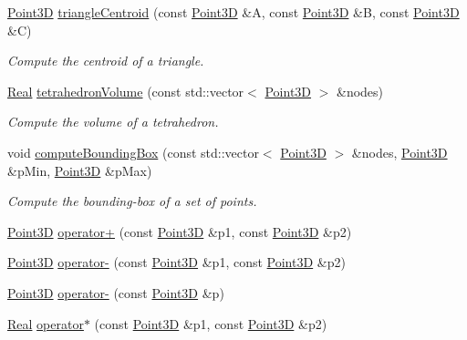 \begin{DoxyCompactItemize}
\hyperlink{classFVCode3D_1_1Point3D}{Point3D} \hyperlink{namespaceFVCode3D_a5b8d6a9c921fcd809d263ef9c484b1ad}{triangle\+Centroid} (const \hyperlink{classFVCode3D_1_1Point3D}{Point3D} \&A, const \hyperlink{classFVCode3D_1_1Point3D}{Point3D} \&B, const \hyperlink{classFVCode3D_1_1Point3D}{Point3D} \&C)
\begin{DoxyCompactList}\small\item\em Compute the centroid of a triangle. \end{DoxyCompactList}\item 
\hyperlink{namespaceFVCode3D_a40c1f5588a248569d80aa5f867080e83}{Real} \hyperlink{namespaceFVCode3D_a8a6b07162e2801b628c3bd4057b9f221}{tetrahedron\+Volume} (const std\+::vector$<$ \hyperlink{classFVCode3D_1_1Point3D}{Point3D} $>$ \&nodes)
\begin{DoxyCompactList}\small\item\em Compute the volume of a tetrahedron. \end{DoxyCompactList}\item 
void \hyperlink{namespaceFVCode3D_ae827f8be7749dd9703b52a52d90c9f9b}{compute\+Bounding\+Box} (const std\+::vector$<$ \hyperlink{classFVCode3D_1_1Point3D}{Point3D} $>$ \&nodes, \hyperlink{classFVCode3D_1_1Point3D}{Point3D} \&p\+Min, \hyperlink{classFVCode3D_1_1Point3D}{Point3D} \&p\+Max)
\begin{DoxyCompactList}\small\item\em Compute the bounding-\/box of a set of points. \end{DoxyCompactList}\item 
\hyperlink{classFVCode3D_1_1Point3D}{Point3D} \hyperlink{namespaceFVCode3D_a78d1c1bb596d0ef685c16686fa4a71f9}{operator+} (const \hyperlink{classFVCode3D_1_1Point3D}{Point3D} \&p1, const \hyperlink{classFVCode3D_1_1Point3D}{Point3D} \&p2)
\item 
\hyperlink{classFVCode3D_1_1Point3D}{Point3D} \hyperlink{namespaceFVCode3D_a57085532e6351dd3b8c54eb16b5f2917}{operator-\/} (const \hyperlink{classFVCode3D_1_1Point3D}{Point3D} \&p1, const \hyperlink{classFVCode3D_1_1Point3D}{Point3D} \&p2)
\item 
\hyperlink{classFVCode3D_1_1Point3D}{Point3D} \hyperlink{namespaceFVCode3D_adc46213e3b69826283d7c31363ec6e98}{operator-\/} (const \hyperlink{classFVCode3D_1_1Point3D}{Point3D} \&p)
\item 
\hyperlink{namespaceFVCode3D_a40c1f5588a248569d80aa5f867080e83}{Real} \hyperlink{namespaceFVCode3D_a34e9f6209d7ce6f615394fb60963d450}{operator$\ast$} (const \hyperlink{classFVCode3D_1_1Point3D}{Point3D} \&p1, const \hyperlink{classFVCode3D_1_1Point3D}{Point3D} \&p2)

\end{DoxyCompactItemize}
